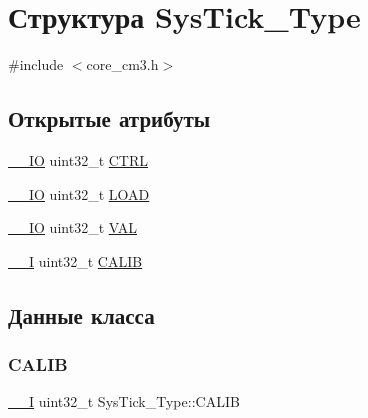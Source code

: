 \hypertarget{struct_sys_tick___type}{}\section{Структура Sys\+Tick\+\_\+\+Type}
\label{struct_sys_tick___type}


{\ttfamily \#include $<$core\+\_\+cm3.\+h$>$}

\subsection*{Открытые атрибуты}
\begin{DoxyCompactItemize}
\item 
\mbox{\hyperlink{group___c_m_s_i_s___c_m3__core__definitions_gaec43007d9998a0a0e01faede4133d6be}{\+\_\+\+\_\+\+IO}} uint32\+\_\+t \mbox{\hyperlink{struct_sys_tick___type_af2ad94ac83e5d40fc6e34884bc1bec5f}{C\+T\+RL}}
\item 
\mbox{\hyperlink{group___c_m_s_i_s___c_m3__core__definitions_gaec43007d9998a0a0e01faede4133d6be}{\+\_\+\+\_\+\+IO}} uint32\+\_\+t \mbox{\hyperlink{struct_sys_tick___type_ae7bc9d3eac1147f3bba8d73a8395644f}{L\+O\+AD}}
\item 
\mbox{\hyperlink{group___c_m_s_i_s___c_m3__core__definitions_gaec43007d9998a0a0e01faede4133d6be}{\+\_\+\+\_\+\+IO}} uint32\+\_\+t \mbox{\hyperlink{struct_sys_tick___type_a0997ff20f11817f8246e8f0edac6f4e4}{V\+AL}}
\item 
\mbox{\hyperlink{group___c_m_s_i_s___c_m3__core__definitions_gaf63697ed9952cc71e1225efe205f6cd3}{\+\_\+\+\_\+I}} uint32\+\_\+t \mbox{\hyperlink{struct_sys_tick___type_a9c9eda0ea6f6a7c904d2d75a6963e238}{C\+A\+L\+IB}}
\end{DoxyCompactItemize}


\subsection{Данные класса}
\mbox{\label{struct_sys_tick___type_a9c9eda0ea6f6a7c904d2d75a6963e238}} 
\subsubsection{\texorpdfstring{CALIB}{CALIB}}
{\footnotesize\ttfamily \mbox{\hyperlink{group___c_m_s_i_s___c_m3__core__definitions_gaf63697ed9952cc71e1225efe205f6cd3}{\+\_\+\+\_\+I}} uint32\+\_\+t Sys\+Tick\+\_\+\+Type\+::\+C\+A\+L\+IB}

